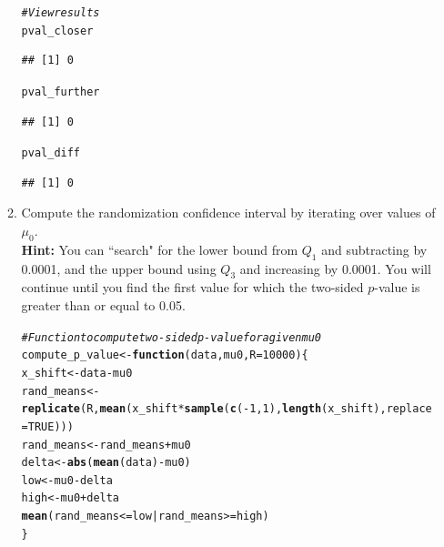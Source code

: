 \documentclass{article}\usepackage[]{graphicx}\usepackage[]{xcolor}
\makeatletter
\newcommand{\hlnum}[1]{\textcolor[rgb]{0.686,0.059,0.569}{#1}}%
\newcommand{\hlcom}[1]{\textcolor[rgb]{0.678,0.584,0.686}{\textit{#1}}}%
\newcommand{\hlopt}[1]{\textcolor[rgb]{0,0,0}{#1}}%
\newcommand{\hldef}[1]{\textcolor[rgb]{0.345,0.345,0.345}{#1}}%
\newcommand{\hlkwa}[1]{\textcolor[rgb]{0.161,0.373,0.58}{\textbf{#1}}}%
\newcommand{\hlkwb}[1]{\textcolor[rgb]{0.69,0.353,0.396}{#1}}%
\newcommand{\hlkwc}[1]{\textcolor[rgb]{0.333,0.667,0.333}{#1}}%
\newcommand{\hlkwd}[1]{\textcolor[rgb]{0.737,0.353,0.396}{\textbf{#1}}}%
\newenvironment{kframe}{%
 \def\at@end@of@kframe{}%
 \ifinner\ifhmode%
  \def\at@end@of@kframe{\end{minipage}}%
  \begin{minipage}{\columnwidth}%
 \fi\fi%
 \def\FrameCommand##1{\hskip\@totalleftmargin \hskip-\fboxsep
 \colorbox{shadecolor}{##1}\hskip-\fboxsep
     \hskip-\linewidth \hskip-\@totalleftmargin \hskip\columnwidth}%
 \MakeFramed {\advance\hsize-\width
   \@totalleftmargin\z@ \linewidth\hsize
   \@setminipage}}%
 {\par\unskip\endMakeFramed%
 \at@end@of@kframe}
\newenvironment{knitrout}{}{} %
\makeatother
\begin{document}
\begin{enumerate}
\begin{enumerate}
\begin{knitrout}
\begin{kframe}
\begin{alltt}
\hlcom{# View results}
\hldef{pval_closer}
\end{alltt}
\begin{verbatim}
## [1] 0
\end{verbatim}
\begin{alltt}
\hldef{pval_further}
\end{alltt}
\begin{verbatim}
## [1] 0
\end{verbatim}
\begin{alltt}
\hldef{pval_diff}
\end{alltt}
\begin{verbatim}
## [1] 0
\end{verbatim}
\end{kframe}
\end{knitrout}
  \item Compute the randomization confidence interval by iterating over values of $\mu_0$.\\
  \textbf{Hint:} You can ``search" for the lower bound from $Q_1$ and subtracting by 0.0001, 
  and the upper bound using $Q_3$ and increasing by 0.0001. You will continue until you find 
  the first value for which the two-sided $p$-value is greater than or equal to 0.05.
\begin{knitrout}
\color{fgcolor}\begin{kframe}
\begin{alltt}
\hlcom{# Function to compute two-sided p-value for a given mu0}
\hldef{compute_p_value} \hlkwb{<-} \hlkwa{function}\hldef{(}\hlkwc{data}\hldef{,} \hlkwc{mu0}\hldef{,} \hlkwc{R} \hldef{=} \hlnum{10000}\hldef{) \{}
  \hldef{x_shift} \hlkwb{<-} \hldef{data} \hlopt{-} \hldef{mu0}
  \hldef{rand_means} \hlkwb{<-} \hlkwd{replicate}\hldef{(R,} \hlkwd{mean}\hldef{(x_shift} \hlopt{*} \hlkwd{sample}\hldef{(}\hlkwd{c}\hldef{(}\hlopt{-}\hlnum{1}\hldef{,} \hlnum{1}\hldef{),} \hlkwd{length}\hldef{(x_shift),} \hlkwc{replace} \hldef{=} \hlnum{TRUE}\hldef{)))}
  \hldef{rand_means} \hlkwb{<-} \hldef{rand_means} \hlopt{+} \hldef{mu0}
  \hldef{delta} \hlkwb{<-} \hlkwd{abs}\hldef{(}\hlkwd{mean}\hldef{(data)} \hlopt{-} \hldef{mu0)}
  \hldef{low} \hlkwb{<-} \hldef{mu0} \hlopt{-} \hldef{delta}
  \hldef{high} \hlkwb{<-} \hldef{mu0} \hlopt{+} \hldef{delta}
  \hlkwd{mean}\hldef{(rand_means} \hlopt{<=} \hldef{low} \hlopt{|} \hldef{rand_means} \hlopt{>=} \hldef{high)}
\hldef{\}}


\end{alltt}
\end{kframe}
\end{knitrout}
\end{enumerate}
\end{enumerate}
\end{document}
